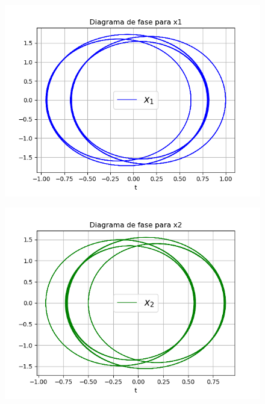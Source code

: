 \documentclass{article}
\begin{document}
\begin{figure}[H]
\centering
\includegraphics[scale=0.59]{31_f1.png}
\end{figure}

\begin{figure}[H]
\centering
\includegraphics[scale=0.59]{31_f2.png}
\end{figure}
\end{document}
